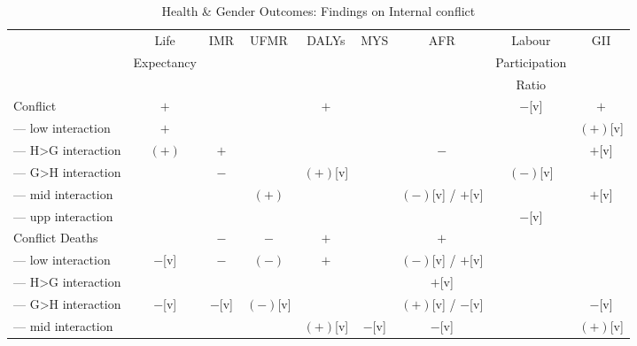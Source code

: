 \begin{landscape}
\begin{table}[!htbp]
\centering
\caption{Health \& Gender Outcomes: Findings on Internal conflict}
\label{table_hg_conflict}
\begin{tabular}{lcccccccc}
\toprule
                         & Life       & IMR      & UFMR     & DALYs    & MYS    & AFR               & Labour        & GII \\
                         & Expectancy &          &          &          &        &                   & Participation & \\
                         &            &          &          &          &        &                   & Ratio         & \\
\midrule
Conflict                 & $+$        &          &          & $+$      &        &                   & $-$[v]        & $+$ \\
--- low interaction      & $+$        &          &          &          &        &                   &               & $(+)$[v] \\
--- H>G interaction      & $(+)$      & $+$      &          &          &        & $-$               &               & $+$[v] \\
--- G>H interaction      &            & $-$      &          & $(+)$[v] &        &                   & $(-)$[v]      & \\
--- mid interaction      &            &          & $(+)$    &          &        & $(-)$[v] / $+$[v] &               & $+$[v] \\
--- upp interaction      &            &          &          &          &        &                   & $-$[v]        & \\
Conflict Deaths          &            & $-$      & $-$      & $+$      &        & $+$               &               & \\
--- low interaction      & $-$[v]     & $-$      & $(-)$    & $+$      &        & $(-)$[v] / $+$[v] &               & \\
--- H>G interaction      &            &          &          &          &        & $+$[v]            &               & \\
--- G>H interaction      & $-$[v]     & $-$[v]   & $(-)$[v] &          &        & $(+)$[v] / $-$[v] &               & $-$[v] \\
--- mid interaction      &            &          &          & $(+)$[v] & $-$[v] & $-$[v]            &               & $(+)$[v] \\

\end{tabular}
\end{table}
\end{landscape}
